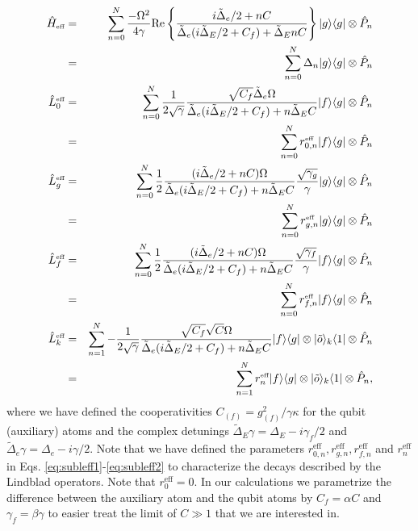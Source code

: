 \begin{eqnarray}
\hat{H}_{\mbox{\tiny eff}}&=&\sum_{n=0}^{N}\frac{-\Omega^{2}}{4\gamma}\mathrm{Re}\left\{\frac{i\tilde{\Delta}_{e}/2+nC}{\tilde{\Delta}_{e}(i\tilde{\Delta}_{E}/2+C_{f})+\tilde{\Delta}_{E}nC}\right\}| g \rangle\langle g |\otimes \hat{P}_{n} \nonumber \\
&=&\sum_{n=0}^{N}\Delta_{n}| g \rangle\langle g |\otimes \hat{P}_{n}
\label{eq:supham2}\\
\hat{L}_{0}^{\mbox{\tiny eff}}&=&\sum_{n=0}^{N}\frac{1}{2\sqrt{\gamma}}\frac{\sqrt{C_{f}}\tilde{\Delta}_{e}\Omega}{\tilde{\Delta}_{e}(i\tilde{\Delta}_{E}/2+C_{f})+n\tilde{\Delta}_{E}C}| f \rangle\langle g |\otimes
\hat{P}_{n} \nonumber \\
&=&\sum_{n=0}^{N}r_{0,n}^{\mbox{\tiny eff}}| f \rangle\langle g |\otimes \hat{P}_{n}
\label{eq:subleff1} \\
\hat{L}_{g}^{\mbox{\tiny eff}}&=&\sum_{n=0}^{N}\frac{1}{2}\frac{(i\tilde{\Delta}_{e}/2+nC)\Omega}{\tilde{\Delta}_{e}(i\tilde{\Delta}_{E}/2+C_{f})+n\tilde{\Delta}_{E}C}\frac{\sqrt{\gamma_{g}}}{\gamma}| g \rangle\langle g |\otimes
\hat{P}_{n} \nonumber \\
&=&\sum_{n=0}^{N}r_{g,n}^{\mbox{\tiny eff}}| g \rangle\langle g |\otimes \hat{P}_{n} \\
\hat{L}_{f}^{\mbox{\tiny eff}}&=&\sum_{n=0}^{N}\frac{1}{2}\frac{(i\tilde{\Delta}_{e}/2+nC)\Omega}{\tilde{\Delta}_{e}(i\tilde{\Delta}_{E}/2+C_{f})+n\tilde{\Delta}_{E}C}\frac{\sqrt{\gamma_{f}}}{\gamma}| f \rangle\langle g |\otimes
\hat{P}_{n} \nonumber \\
&=&\sum_{n=0}^{N}r_{f,n}^{\mbox{\tiny eff}}| f \rangle\langle g |\otimes \hat{P}_{n} \\
\hat{L}_{k}^{\mbox{\tiny eff}}&=&\sum_{n=1}^{N}-\frac{1}{2\sqrt{\gamma}}\frac{\sqrt{C_{f}}\sqrt{C}\Omega}{\tilde{\Delta}_{e}(i\tilde{\Delta}_{E}/2+C_{f})+n\tilde{\Delta}_{E}C}| f \rangle\langle g |\otimes| \tilde{o} \rangle_{k}\langle 1 |\otimes\hat{P}_{n}
\nonumber \\
&=&\sum_{n=1}^{N}r_{n}^{\mbox{\tiny eff}}| f \rangle\langle g |\otimes| \tilde{o} \rangle_{k}\langle 1 |\otimes\hat{P}_{n},
\label{eq:subleff2}
\end{eqnarray}
where we have defined the cooperativities $C_{(f)}=g_{(f)}^{2}/\gamma\kappa$ for
the qubit (auxiliary) atoms and the complex detunings
$\tilde{\Delta}_{E}\gamma=\Delta_{E}-i\gamma_{f}/2$ and 
$\tilde{\Delta}_{e}\gamma=\Delta_{e}-i\gamma/2$. Note that we have defined the
parameters $r^{\text{eff}}_{0,n}, r^{\text{eff}}_{g,n},r^{\text{eff}}_{f,n}$ and
$r_{n}^{\text{eff}}$ in Eqs. \eqref{eq:subleff1}-\eqref{eq:subleff2} to
characterize the decays described by the Lindblad operators. Note that
$r_{0}^{\text{eff}}=0$. In our calculations we parametrize the difference
between the auxiliary atom and the qubit atoms by $C_{f}=\alpha C$ and
$\gamma_{f}=\beta\gamma$ to easier treat the limit of $C\gg1$ that we are
interested in.

